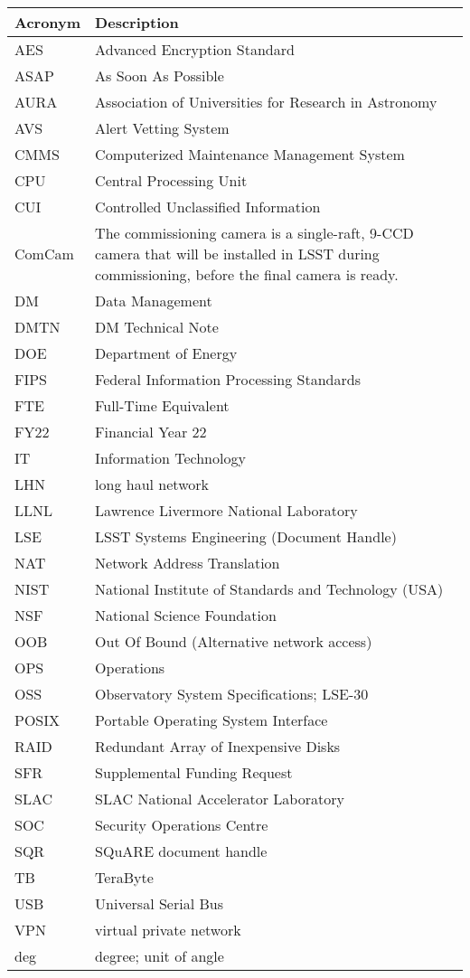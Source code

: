 \addtocounter{table}{-1}
\begin{longtable}{p{}p{}}\hline
\textbf{Acronym} & \textbf{Description}  \\\hline

AES & Advanced Encryption Standard \\\hline
ASAP & As Soon As Possible \\\hline
AURA & Association of Universities for Research in Astronomy \\\hline
AVS &  Alert Vetting System \\\hline
CMMS & Computerized Maintenance Management System \\\hline
CPU & Central Processing Unit \\\hline
CUI & Controlled Unclassified Information \\\hline
ComCam & The commissioning camera is a single-raft, 9-CCD camera that will be installed in LSST during commissioning, before the final camera is ready. \\\hline
DM & Data Management \\\hline
DMTN & DM Technical Note \\\hline
DOE & Department of Energy \\\hline
FIPS & Federal Information Processing Standards \\\hline
FTE & Full-Time Equivalent \\\hline
FY22 & Financial Year 22 \\\hline
IT & Information Technology \\\hline
LHN & long haul network \\\hline
LLNL & Lawrence Livermore National Laboratory \\\hline
LSE & LSST Systems Engineering (Document Handle) \\\hline
NAT & Network Address Translation \\\hline
NIST & National Institute of Standards and Technology (USA) \\\hline
NSF & National Science Foundation \\\hline
OOB & Out Of Bound (Alternative network access) \\\hline
OPS & Operations \\\hline
OSS & Observatory System Specifications; LSE-30 \\\hline
POSIX & Portable Operating System Interface \\\hline
RAID & Redundant Array of Inexpensive Disks \\\hline
SFR & Supplemental Funding Request \\\hline
SLAC & SLAC National Accelerator Laboratory \\\hline
SOC & Security Operations Centre \\\hline
SQR & SQuARE document handle \\\hline
TB & TeraByte \\\hline
USB & Universal Serial Bus \\\hline
VPN & virtual private network \\\hline
deg & degree; unit of angle \\\hline
\end{longtable}
